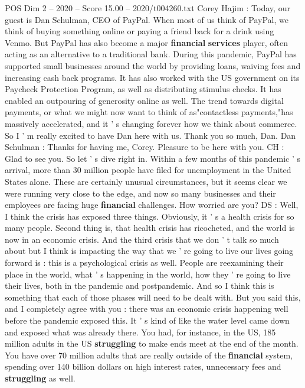 \begin{textsample}{POS Dim 2 – 2020 – Score 15.00 – 2020/t004260.txt}  \label{ex:f2_pos_018}
Corey Hajim : Today, our guest is Dan Schulman, CEO of PayPal.
When most of us think of PayPal, we think of buying something online or paying a friend back for a drink using Venmo.
But PayPal has also become a major \textbf{financial} \textbf{services} player, often acting as an alternative to a traditional bank.
During this pandemic, PayPal has supported small businesses around the world by providing loans, waiving fees and increasing cash back programs.
It has also worked with the US government on its Paycheck Protection Program, as well as distributing stimulus checks.
It has enabled an outpouring of generosity online as well.
The trend towards digital payments, or what we might now want to think of as"contactless payments,"has massively accelerated, and it ' s changing forever how we think about commerce.
So I ' m really excited to have Dan here with us.
Thank you so much, Dan.
Dan Schulman : Thanks for having me, Corey.
Pleasure to be here with you.
CH : Glad to see you.
So let ' s dive right in.
Within a few months of this pandemic ' s arrival, more than 30 million people have filed for unemployment in the United States alone.
These are certainly unusual circumstances, but it seems clear we were running very close to the edge, and now so many businesses and their employees are facing huge \textbf{financial} challenges.
How worried are you?
DS : Well, I think the crisis has exposed three things.
Obviously, it ' s a health crisis for so many people.
Second thing is, that health crisis has ricocheted, and the world is now in an economic crisis.
And the third crisis that we don ' t talk so much about but I think is impacting the way that we ' re going to live our lives going forward is : this is a psychological crisis as well.
People are reexamining their place in the world, what ' s happening in the world, how they ' re going to live their lives, both in the pandemic and postpandemic.
And so I think this is something that each of those phases will need to be dealt with.
But you said this, and I completely agree with you : there was an economic crisis happening well before the pandemic exposed this.
It ' s kind of like the water level came down and exposed what was already there.
You had, for instance, in the US, 185 million adults in the US \textbf{struggling} to make ends meet at the end of the month.
You have over 70 million adults that are really outside of the \textbf{financial} system, spending over 140 billion dollars on high interest rates, unnecessary fees and \textbf{struggling} as well.

\end{textsample}
